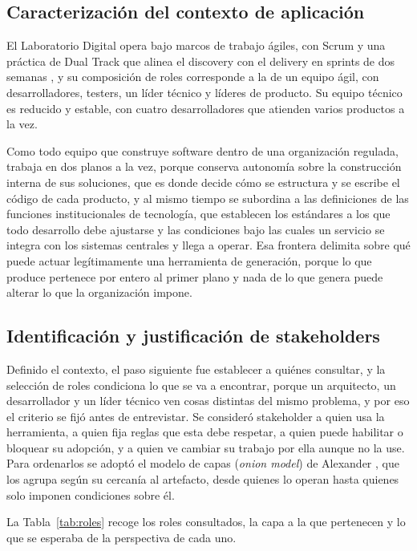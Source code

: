 \subsection{Caracterización del contexto de aplicación}
\label{sec:caracterizacion}

El Laboratorio Digital opera bajo marcos de trabajo ágiles, con Scrum y una
práctica de Dual Track que alinea el discovery con el delivery en sprints de
dos semanas \citep{MartyCagan2012}, y su composición de roles corresponde a la
de un equipo ágil, con desarrolladores, testers, un líder técnico y líderes de
producto. Su equipo técnico es reducido y estable, con cuatro desarrolladores
que atienden varios productos a la vez.

Como todo equipo que construye software dentro de una organización regulada,
trabaja en dos planos a la vez, porque conserva autonomía sobre la
construcción interna de sus soluciones, que es donde decide cómo se estructura
y se escribe el código de cada producto, y al mismo tiempo se subordina a las
definiciones de las funciones institucionales de tecnología, que establecen
los estándares a los que todo desarrollo debe ajustarse y las condiciones bajo
las cuales un servicio se integra con los sistemas centrales y llega a operar.
Esa frontera delimita sobre qué puede actuar legítimamente una herramienta de
generación, porque lo que produce pertenece por entero al primer plano y nada
de lo que genera puede alterar lo que la organización impone.

\subsection{Identificación y justificación de stakeholders}
\label{sec:stakeholders}

Definido el contexto, el paso siguiente fue establecer a quiénes consultar, y
la selección de roles condiciona lo que se va a encontrar, porque un
arquitecto, un desarrollador y un líder técnico ven cosas distintas del mismo
problema, y por eso el criterio se fijó antes de entrevistar. Se consideró
stakeholder a quien usa la herramienta, a quien fija reglas que esta debe
respetar, a quien puede habilitar o bloquear su adopción, y a quien ve cambiar
su trabajo por ella aunque no la use. Para ordenarlos se adoptó el modelo de
capas (\emph{onion model}) de Alexander \citep{Alexander2005}, que los agrupa
según su cercanía al artefacto, desde quienes lo operan hasta quienes solo
imponen condiciones sobre él.

La Tabla~\ref{tab:roles} recoge los roles consultados, la capa a la que
pertenecen y lo que se esperaba de la perspectiva de cada uno.

